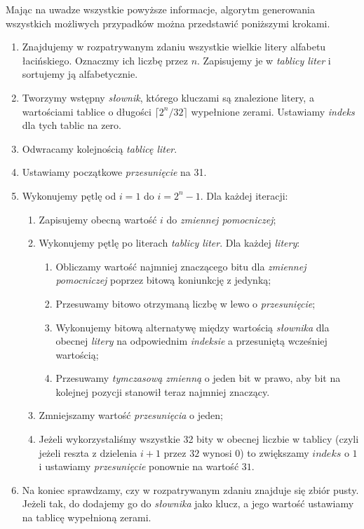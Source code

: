 \documentclass{SGGW-thesis}
\begin{document}
\begin{paragraph}{}
    Mając na uwadze wszystkie powyższe informacje, algorytm generowania wszystkich możliwych przypadków można przedstawić poniższymi krokami.
    \begin{enumerate}
        \item Znajdujemy w rozpatrywanym zdaniu wszystkie wielkie litery alfabetu łacińskiego. Oznaczmy ich liczbę przez $n$. Zapisujemy je w \emph{tablicy liter} i sortujemy ją alfabetycznie.
        \item Tworzymy wstępny \emph{słownik}, którego kluczami są znalezione litery, a wartościami tablice o długości $\lceil 2^{n} / 32 \rceil$ wypełnione zerami. Ustawiamy \emph{indeks} dla tych tablic na zero.
        \item Odwracamy kolejnością \emph{tablicę liter}.
        \item Ustawiamy początkowe \emph{przesunięcie} na 31.
        \item Wykonujemy pętlę od $i=1$ do $i=2^{n}-1$. Dla każdej iteracji:
        \begin{enumerate}
            \item Zapisujemy obecną wartość $i$ do \emph{zmiennej pomocniczej};
            \item Wykonujemy pętlę po literach \emph{tablicy liter}. Dla każdej \emph{litery}:
            \begin{enumerate}
                \item Obliczamy wartość najmniej znaczącego bitu dla \emph{zmiennej pomocniczej} poprzez bitową koniunkcję z jedynką;
                \item Przesuwamy bitowo otrzymaną liczbę w lewo o \emph{przesunięcie};
                \item Wykonujemy bitową alternatywę między wartością \emph{słownika} dla obecnej \emph{litery} na odpowiednim \emph{indeksie} a przesuniętą wcześniej wartością;
                \item Przesuwamy \emph{tymczasową zmienną} o jeden bit w prawo, aby bit na kolejnej pozycji stanowił teraz najmniej znaczący.
            \end{enumerate}
            \item Zmniejszamy wartość \emph{przesunięcia} o jeden;
            \item Jeżeli wykorzystaliśmy wszystkie 32 bity w obecnej liczbie w tablicy (czyli jeżeli reszta z dzielenia $i + 1$ przez $32$ wynosi $0$) to zwiększamy $indeks$ o $1$ i ustawiamy \emph{przesunięcie} ponownie na wartość $31$.
        \end{enumerate}
        \item Na koniec sprawdzamy, czy w rozpatrywanym zdaniu znajduje się zbiór pusty. Jeżeli tak, do dodajemy go do \emph{słownika} jako klucz, a jego wartość ustawiamy na tablicę wypełnioną zerami.
    \end{enumerate}
\end{paragraph}
\end{document}

